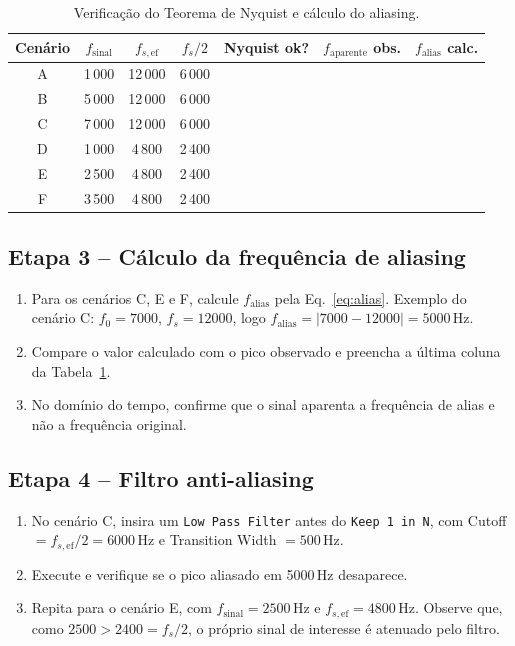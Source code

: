 \documentclass[11pt,a4paper]{article}
\begin{document}
\begin{table}[H]
  \centering
  \begin{tabular}{c c c c c c c}
    \toprule
    Cenário & $f_\text{sinal}$ & $f_{s,\text{ef}}$ & $f_s/2$ &
      Nyquist ok? & $f_\text{aparente}$ obs. & $f_\text{alias}$ calc. \\
    \midrule
    A & 1\,000 & 12\,000 & 6\,000 & & &  \\
    B & 5\,000 & 12\,000 & 6\,000 & & &  \\
    C & 7\,000 & 12\,000 & 6\,000 & & &  \\
    D & 1\,000 & 4\,800  & 2\,400 & & &  \\
    E & 2\,500 & 4\,800  & 2\,400 & & &  \\
    F & 3\,500 & 4\,800  & 2\,400 & & &  \\
    \bottomrule
  \end{tabular}
  \caption{Verificação do Teorema de Nyquist e cálculo do aliasing.}
  \label{tab:nyquist}
\end{table}

\subsection*{Etapa 3 -- Cálculo da frequência de aliasing}

\begin{instrucao}
\begin{enumerate}[label=\arabic*.]
  \item Para os cenários C, E e F, calcule $f_\text{alias}$ pela
    Eq.~\eqref{eq:alias}. Exemplo do cenário C: $f_0 = 7000$, $f_s = 12000$,
    logo $f_\text{alias} = |7000 - 12000| = 5000$\,Hz.
  \item Compare o valor calculado com o pico observado e preencha a última
    coluna da Tabela~\ref{tab:nyquist}.
  \item No domínio do tempo, confirme que o sinal aparenta a frequência
    de alias e não a frequência original.
\end{enumerate}
\end{instrucao}

\subsection*{Etapa 4 -- Filtro anti-aliasing}

\begin{instrucao}
\begin{enumerate}[label=\arabic*.]
  \item No cenário C, insira um \texttt{Low Pass Filter} antes do
    \texttt{Keep 1 in N}, com Cutoff $= f_{s,\text{ef}}/2 = 6000$\,Hz e
    Transition Width $= 500$\,Hz.
  \item Execute e verifique se o pico aliasado em 5000\,Hz desaparece.
  \item Repita para o cenário E, com $f_\text{sinal} = 2500$\,Hz e
    $f_{s,\text{ef}} = 4800$\,Hz. Observe que, como $2500 > 2400 = f_s/2$, o
    próprio sinal de interesse é atenuado pelo filtro.
\end{enumerate}
\end{instrucao}
\end{document}
